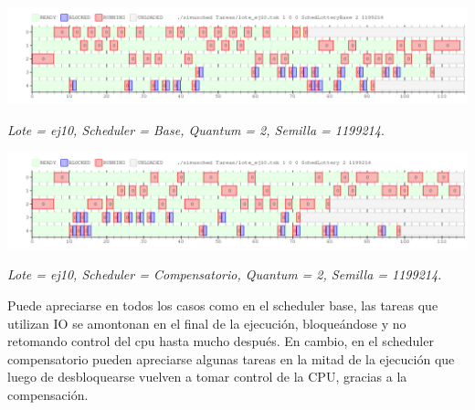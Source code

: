 \includegraphics[width=1\textwidth]{./Graficos/Ej10/testBase5.png}
\begin{center}
 \textit{Lote = ej10, Scheduler = Base, Quantum = 2, Semilla = 1199214}.
\end{center}


\includegraphics[width=1\textwidth]{./Graficos/Ej10/testComp5.png}
\begin{center}
 \textit{Lote = ej10, Scheduler = Compensatorio, Quantum = 2, Semilla = 1199214}.
\end{center}


Puede apreciarse en todos los casos como en el scheduler base, las tareas que utilizan IO se amontonan en el final de la ejecuci\'on, bloque\'andose y no retomando control del cpu hasta mucho despu\'es. En cambio, en el scheduler compensatorio pueden apreciarse algunas tareas en la mitad de la ejecuci\'on que luego de desbloquearse vuelven a tomar control de la CPU, gracias a la compensaci\'on.
